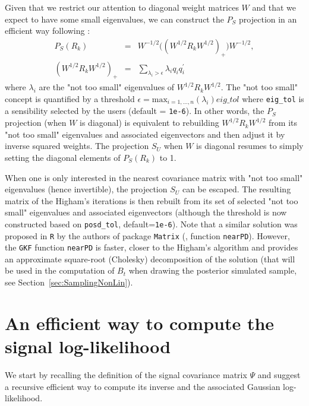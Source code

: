 \documentclass{article}
\newcommand{\R}{\texttt{R}\xspace}
\newcommand{\GKF}{\texttt{GKF}\xspace}
\begin{document}
Given that we restrict our attention to diagonal weight matrices $W$ and that we expect to
have some small eigenvalues, we can construct the $P_S$ projection in an efficient way
following \citet[Theorem~3.2-Corollary~3.5]{higham2002computing}:
\begin{equation}
\begin{array}{rcl}
  P_S(R_k) & = & W^{-1/2} \Bigg ( (W^{1/2}R_kW^{1/2})_{+} \Bigg ) W^{-1/2}, \\
  (W^{1/2}R_kW^{1/2})_{+} & = & \displaystyle \sum_{\lambda_i > \epsilon} \lambda_i q_i q_i ^\prime
  \end{array}
 \label{eq:PSProj}
\end{equation}
where $\lambda_i$ are the "not too small" eigenvalues of $W^{1/2}R_kW^{1/2}$. The "not too
small" concept is quantified by a threshold
$\epsilon = \text{max}_{i=1,\dots,n} (\lambda_i) eig\_tol$ where \texttt{eig\_tol} is a
sensibility selected by the users (default = \texttt{1e-6}). In other words, the $P_S$
projection (when $W$ is diagonal) is equivalent to rebuilding $W^{1/2}R_kW^{1/2}$ from its
"not too small" eigenvalues and associated eigenvectors and then adjust it by inverse squared
weights. The projection $S_U$ when $W$ is diagonal resumes to simply setting the diagonal
elements of $P_S(R_k)$ to 1.

When one is only interested in the nearest covariance matrix with "not too small" eigenvalues
(hence invertible), the projection $S_U$ can be escaped. The resulting matrix of the Higham's
iterations is then rebuilt from its set of selected "not too small" eigenvalues and
associated eigenvectors (although the threshold is now constructed based on
\texttt{posd\_tol}, default=\texttt{1e-6}). Note that a similar solution was proposed in \R
by the authors of package \texttt{Matrix} (\cite{maechler20062nd}, function
\texttt{nearPD}). However, the \GKF function \texttt{nearPD} is faster, closer to the
Higham's algorithm and provides an approximate square-root (Cholesky) decomposition of the
solution (that will be used in the computation of $B_t$ when drawing the posterior simulated
sample, see Section~\ref{sec:SamplingNonLin}).

\section{An efficient way to compute the signal log-likelihood}
\label{App:logLikCompute}

We start by recalling the definition of the signal covariance matrix $\Psi$ and suggest a
recursive efficient way to compute its inverse and the associated Gaussian log-likelihood.
\end{document}
